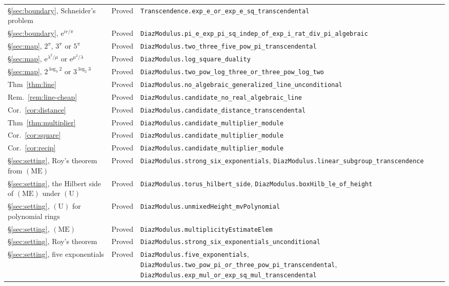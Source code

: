 \documentclass[11pt,a4paper]{article}
\theoremstyle{plain}
\theoremstyle{definition}
\newcommand{\e}{\mathrm{e}}
\begin{document}
\begin{center}
\begin{longtable}{@{}llp{6.2cm}@{}}
\S\ref{sec:boundary}, Schneider's problem & Proved & \nolinkurl{Transcendence.exp_e_or_exp_e_sq_transcendental} \\
\S\ref{sec:boundary}, $\e^{ir/\pi}$ & Proved & \nolinkurl{DiazModulus.pi_e_exp_pi_sq_indep_of_exp_i_rat_div_pi_algebraic} \\
\S\ref{sec:map}, $2^{\pi}$, $3^{\pi}$ or $5^{\pi}$ & Proved & \nolinkurl{DiazModulus.two_three_five_pow_pi_transcendental} \\
\S\ref{sec:map}, $\e^{\lambda^{2}/\mu}$ or $\e^{\mu^{2}/\lambda}$ & Proved & \nolinkurl{DiazModulus.log_square_duality} \\
\S\ref{sec:map}, $2^{\log_{3}2}$ or $3^{\log_{2}3}$ & Proved & \nolinkurl{DiazModulus.two_pow_log_three_or_three_pow_log_two} \\
Thm~\ref{thm:line} & Proved & \nolinkurl{DiazModulus.no_algebraic_generalized_line_unconditional} \\
Rem.~\ref{rem:line-cheap} & Proved & \nolinkurl{DiazModulus.candidate_no_real_algebraic_line} \\
Cor.~\ref{cor:distance} & Proved & \nolinkurl{DiazModulus.candidate_distance_transcendental} \\
Thm~\ref{thm:multiplier} & Proved & \nolinkurl{DiazModulus.candidate_multiplier_module} \\
Cor.~\ref{cor:square} & Proved & \nolinkurl{DiazModulus.candidate_multiplier_module} \\
Cor.~\ref{cor:recip} & Proved & \nolinkurl{DiazModulus.candidate_multiplier_module} \\
\S\ref{sec:setting}, Roy's theorem from $(\mathrm{ME})$ & Proved & \nolinkurl{DiazModulus.strong_six_exponentials}, \nolinkurl{DiazModulus.linear_subgroup_transcendence} \\
\S\ref{sec:setting}, the Hilbert side of $(\mathrm{ME})$ under $(\mathrm{U})$ & Proved & \nolinkurl{DiazModulus.torus_hilbert_side}, \nolinkurl{DiazModulus.boxHilb_le_of_height} \\
\S\ref{sec:setting}, $(\mathrm{U})$ for polynomial rings & Proved & \nolinkurl{DiazModulus.unmixedHeight_mvPolynomial} \\
\S\ref{sec:setting}, $(\mathrm{ME})$ & Proved & \nolinkurl{DiazModulus.multiplicityEstimateElem} \\
\S\ref{sec:setting}, Roy's theorem & Proved & \nolinkurl{DiazModulus.strong_six_exponentials_unconditional} \\
\S\ref{sec:setting}, five exponentials & Proved & \nolinkurl{DiazModulus.five_exponentials}, \nolinkurl{DiazModulus.two_pow_pi_or_three_pow_pi_transcendental}, \nolinkurl{DiazModulus.exp_mul_or_exp_sq_mul_transcendental} \\

\end{longtable}
\end{center}
\end{document}
